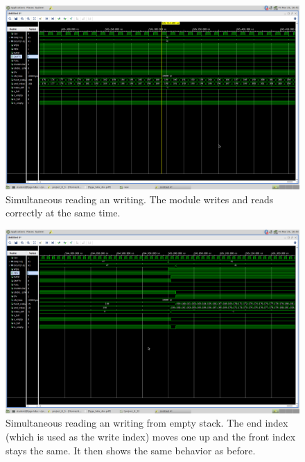 \begin{figure}
    \includegraphics[width=.9\textwidth]{L8/E3/read_and_write_sametime.png}
    \caption{Simultaneous reading an writing. The module writes and reads correctly at the same time.}
    \label{pic: r and e from half stack fifo}
\end{figure}

\begin{figure}
    \includegraphics[width=.9\textwidth]{L8/E3/read_write_from_empty.png}
    \caption{Simultaneous reading an writing from empty stack. The end index (which is used as the write index) moves one up and the front index stays the same. It then shows the same behavior as before.}
    \label{pic: r and e from e stack fifo}
\end{figure}

